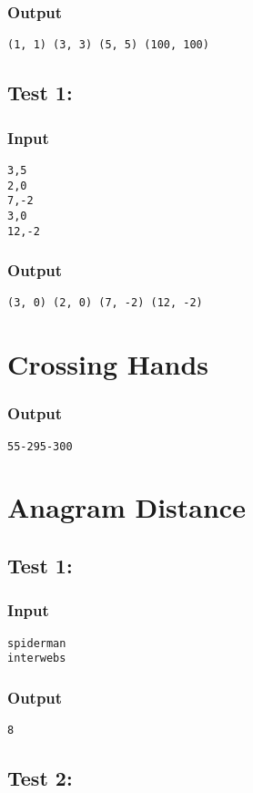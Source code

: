 \documentclass[twocolumn,9pt]{extarticle}
\begin{document}
\subsubsection*{Output}
\texttt{(1, 1) (3, 3) (5, 5) (100, 100)}

\subsection*{Test 1:}
\subsubsection*{Input}
\texttt{3,5\\
2,0\\
7,-2\\
3,0\\
12,-2}

\subsubsection*{Output}
\texttt{(3, 0) (2, 0) (7, -2) (12, -2)}

\section{Crossing Hands}
\subsubsection*{Output}
\texttt{55-295-300}

\section{Anagram Distance}
\subsection*{Test 1:}
\subsubsection*{Input}
\texttt{spiderman\\
interwebs}

\subsubsection*{Output}
\texttt{8}

\subsection*{Test 2:}
\end{document}
